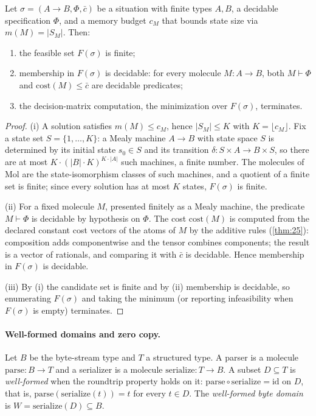 \begin{theorem}\label{thm:51}
Let $\sigma = (A \to B, \Phi, \bar c)$ be a situation with finite types $A, B$, a decidable specification $\Phi$, and a memory budget $c_M$ that bounds state size via $m (M) = |S_M|$. Then:
\begin{enumerate}
\item the feasible set $F (\sigma)$ is finite;
\item membership in $F (\sigma)$ is decidable: for every molecule $M : A \to B$, both $M \vdash \Phi$ and $\mathrm{cost} (M) \leq \bar c$ are decidable predicates;
\item the decision-matrix computation, the minimization over $F (\sigma)$, terminates.
\end{enumerate}
\end{theorem}

\begin{proof}
(i) A solution satisfies $m (M) \leq c_M$, hence $|S_M| \leq K$ with $K = \lfloor c_M \rfloor$. Fix a state set $S = \{1, \ldots, K\}$: a Mealy machine $A \to B$ with state space $S$ is determined by its initial state $s_0 \in S$ and its transition $\delta : S \times A \to B \times S$, so there are at most $K \cdot (|B| \cdot K)^{K \cdot |A|}$ such machines, a finite number. The molecules of Mol are the state-isomorphism classes of such machines, and a quotient of a finite set is finite; since every solution has at most $K$ states, $F (\sigma)$ is finite.

(ii) For a fixed molecule $M$, presented finitely as a Mealy machine, the predicate $M \vdash \Phi$ is decidable by hypothesis on $\Phi$. The cost $\mathrm{cost} (M)$ is computed from the declared constant cost vectors of the atoms of $M$ by the additive rules (\autoref{thm:25}): composition adds componentwise and the tensor combines components; the result is a vector of rationals, and comparing it with $\bar c$ is decidable. Hence membership in $F (\sigma)$ is decidable.

(iii) By (i) the candidate set is finite and by (ii) membership is decidable, so enumerating $F (\sigma)$ and taking the minimum (or reporting infeasibility when $F (\sigma)$ is empty) terminates.
\end{proof}

\paragraph{Well-formed domains and zero copy.}
Let $B$ be the byte-stream type and $T$ a structured type. A parser is a molecule $\mathrm{parse} : B \to T$ and a serializer is a molecule $\mathrm{serialize} : T \to B$. A subset $D \subseteq T$ is \emph{well-formed} when the roundtrip property holds on it: $\mathrm{parse} \circ \mathrm{serialize} = \mathrm{id}$ on $D$, that is, $\mathrm{parse} (\mathrm{serialize} (t)) = t$ for every $t \in D$. The \emph{well-formed byte domain} is $W = \mathrm{serialize} (D) \subseteq B$.

